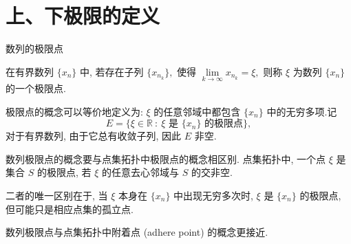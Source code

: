 
\section[定义]{上、下极限的定义}


\begin{frame}{数列的极限点}

\begin{Def}
在有界数列 $\{x_n\}$ 中, 若存在子列 $\{x_{n_k}\},$ 使得 $\lim\limits_{k \to \infty} x_{n_k} = \xi,$ 则称 $\xi$ 为数列 $\{x_n\}$ 的一个\alert{极限点}.
\end{Def}

\pause

极限点的概念可以等价地定义为: $\xi$ 的任意邻域中都包含 $\{x_n\}$ 中的无穷多项.记
\[E = \{ \xi\in\mathbb{R} ~:~ \xi \text{ 是 $\{x_n\}$ 的极限点} \},\]
对于有界数列, 由于它总有收敛子列, 因此 $E$ 非空.

\begin{attnblock}
数列极限点的概念要与点集拓扑中极限点的概念相区别. 点集拓扑中, 一个点 $\xi$ 是集合 $S$ 的极限点, 若 $\xi$ 的任意去心邻域与 $S$ 的交非空.

\pause

二者的唯一区别在于, 当 $\xi$ 本身在 $\{x_n\}$ 中出现无穷多次时, $\xi$ 是 $\{x_n\}$ 的极限点, 但可能只是相应点集的孤立点.

\pause

数列极限点与点集拓扑中附着点 (adhere point) 的概念更接近.
\end{attnblock}

\end{frame}


